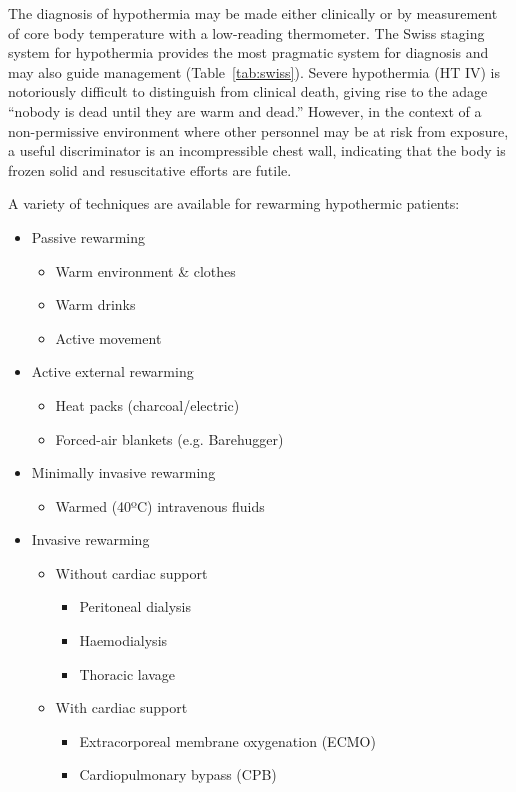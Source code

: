 \documentclass[12pt,a4paper]{article}
\begin{document}
The diagnosis of hypothermia may be made either clinically or by measurement of core body temperature with a low-reading thermometer. The Swiss staging system for hypothermia provides the most pragmatic system for diagnosis and may also guide management (Table~\ref{tab:swiss}).\cite{Durrer:2003it} Severe hypothermia (HT IV) is notoriously difficult to distinguish from clinical death, giving rise to the adage ``nobody is dead until they are warm and dead.'' However, in the context of a non-permissive environment where other personnel may be at risk from exposure, a useful discriminator is an incompressible chest wall, indicating that the body is frozen solid and resuscitative efforts are futile.\cite{Brown:2012ja}

A variety of techniques are available for rewarming hypothermic patients:\cite{Brown:2012ja}

\begin{itemize}
    \item Passive rewarming
    \begin{itemize}
        \item Warm environment \& clothes
        \item Warm drinks
        \item Active movement
    \end{itemize}
    \item Active external rewarming
    \begin{itemize}
        \item Heat packs (charcoal/electric)
        \item Forced-air blankets (e.g. Barehugger)
    \end{itemize}
    \item Minimally invasive rewarming
    \begin{itemize}
        \item Warmed (40ºC) intravenous fluids
    \end{itemize}
    \item Invasive rewarming
    \begin{itemize}
        \item Without cardiac support
        \begin{itemize}
            \item Peritoneal dialysis
            \item Haemodialysis
            \item Thoracic lavage
        \end{itemize}
        \item With cardiac support
        \begin{itemize}
            \item Extracorporeal membrane oxygenation (ECMO)
            \item Cardiopulmonary bypass (CPB)
        \end{itemize}
    \end{itemize}
\end{itemize}
\end{document}
